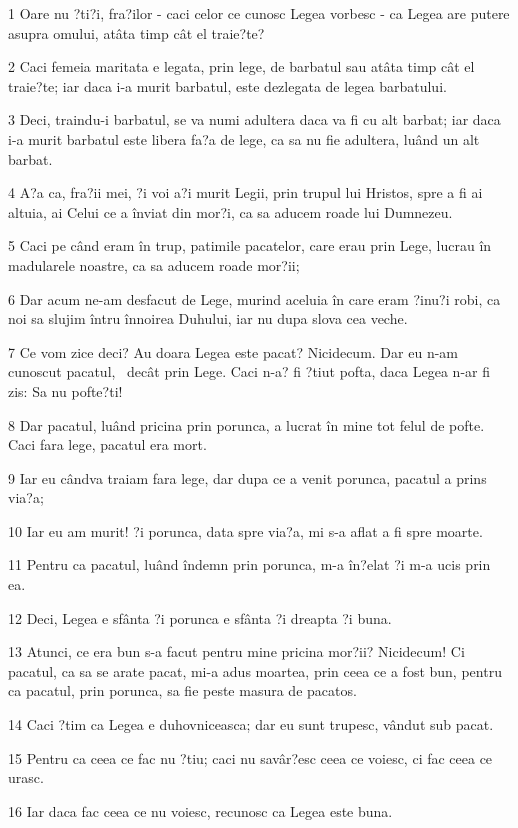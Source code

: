 \par 1 Oare nu ?ti?i, fra?ilor - caci celor ce cunosc Legea vorbesc - ca Legea are putere asupra omului, atâta timp cât el traie?te?
\par 2 Caci femeia maritata e legata, prin lege, de barbatul sau atâta timp cât el traie?te; iar daca i-a murit barbatul, este dezlegata de legea barbatului.
\par 3 Deci, traindu-i barbatul, se va numi adultera daca va fi cu alt barbat; iar daca i-a murit barbatul este libera fa?a de lege, ca sa nu fie adultera, luând un alt barbat.
\par 4 A?a ca, fra?ii mei, ?i voi a?i murit Legii, prin trupul lui Hristos, spre a fi ai altuia, ai Celui ce a înviat din mor?i, ca sa aducem roade lui Dumnezeu.
\par 5 Caci pe când eram în trup, patimile pacatelor, care erau prin Lege, lucrau în madularele noastre, ca sa aducem roade mor?ii;
\par 6 Dar acum ne-am desfacut de Lege, murind aceluia în care eram ?inu?i robi, ca noi sa slujim întru înnoirea Duhului, iar nu dupa slova cea veche.
\par 7 Ce vom zice deci? Au doara Legea este pacat? Nicidecum. Dar eu n-am cunoscut pacatul,  decât prin Lege. Caci n-a? fi ?tiut pofta, daca Legea n-ar fi zis: Sa nu pofte?ti!
\par 8 Dar pacatul, luând pricina prin porunca, a lucrat în mine tot felul de pofte. Caci fara lege, pacatul era mort.
\par 9 Iar eu cândva traiam fara lege, dar dupa ce a venit porunca, pacatul a prins via?a;
\par 10 Iar eu am murit! ?i porunca, data spre via?a, mi s-a aflat a fi spre moarte.
\par 11 Pentru ca pacatul, luând îndemn prin porunca, m-a în?elat ?i m-a ucis prin ea.
\par 12 Deci, Legea e sfânta ?i porunca e sfânta ?i dreapta ?i buna.
\par 13 Atunci, ce era bun s-a facut pentru mine pricina mor?ii? Nicidecum! Ci pacatul, ca sa se arate pacat, mi-a adus moartea, prin ceea ce a fost bun, pentru ca pacatul, prin porunca, sa fie peste masura de pacatos.
\par 14 Caci ?tim ca Legea e duhovniceasca; dar eu sunt trupesc, vândut sub pacat.
\par 15 Pentru ca ceea ce fac nu ?tiu; caci nu savâr?esc ceea ce voiesc, ci fac ceea ce urasc.
\par 16 Iar daca fac ceea ce nu voiesc, recunosc ca Legea este buna.
